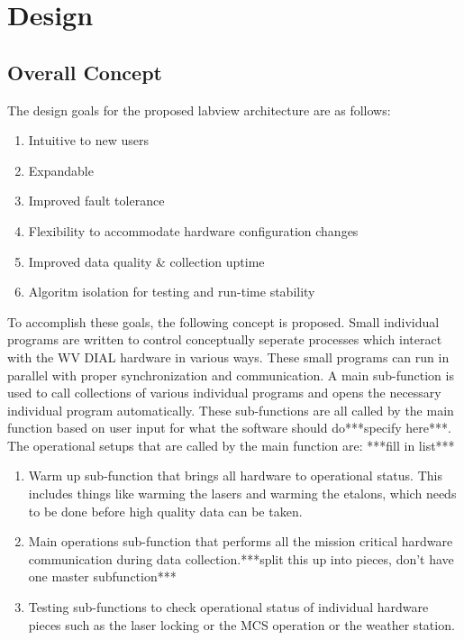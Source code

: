 
\section{Design}

\subsection{Overall Concept}

The design goals for the proposed labview architecture are as follows:

\begin{enumerate}
  \item{Intuitive to new users}
  \item{Expandable}
  \item{Improved fault tolerance}
  \item{Flexibility to accommodate hardware configuration changes}
  \item{Improved data quality \& collection uptime}
  \item{Algoritm isolation for testing and run-time stability}
\end{enumerate}

To accomplish these goals, the following concept is proposed. Small individual programs are written to control conceptually seperate processes which interact with the WV DIAL hardware in various ways. These small programs can run in parallel with proper synchronization and communication. A main sub-function is used to call collections of various individual programs and opens the necessary individual program automatically. These sub-functions are all called by the main function based on user input for what the software should do***specify here***. The operational setups that are called by the main function are: ***fill in list***

\begin{enumerate}
	\item{Warm up sub-function that brings all hardware to operational status. This includes things like warming the lasers and warming the etalons, which needs to be done before high quality data can be taken.}
	\item{Main operations sub-function that performs all the mission critical hardware communication during data collection.}***split this up into pieces, don't have one master subfunction***
	\item{Testing sub-functions to check operational status of individual hardware pieces such as the laser locking or the MCS operation or the weather station.}
\end{enumerate}

